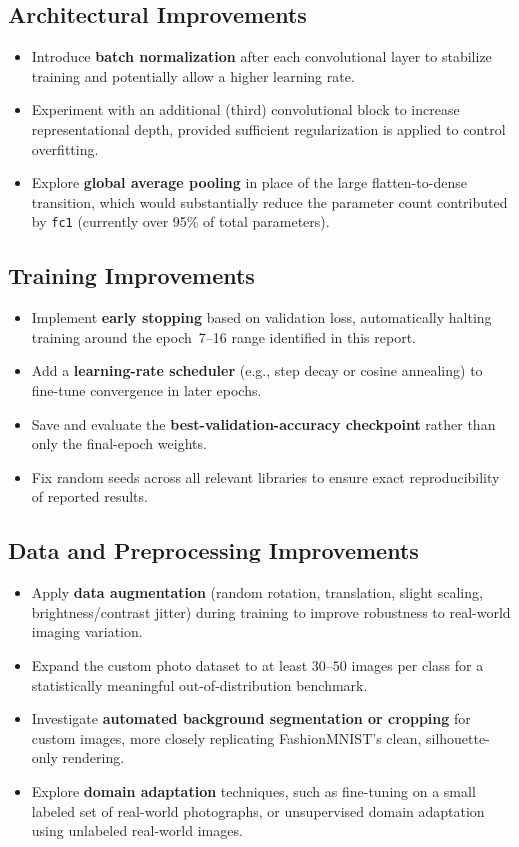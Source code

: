 \documentclass[12pt,a4paper]{report}
\begin{document}
\subsection{Architectural Improvements}
\begin{itemize}
    \item Introduce \textbf{batch normalization} after each convolutional layer to stabilize training and potentially allow a higher learning rate.
    \item Experiment with an additional (third) convolutional block to increase representational depth, provided sufficient regularization is applied to control overfitting.
    \item Explore \textbf{global average pooling} in place of the large flatten-to-dense transition, which would substantially reduce the parameter count contributed by \texttt{fc1} (currently over 95\% of total parameters).
\end{itemize}

\subsection{Training Improvements}
\begin{itemize}
    \item Implement \textbf{early stopping} based on validation loss, automatically halting training around the epoch~7--16 range identified in this report.
    \item Add a \textbf{learning-rate scheduler} (e.g., step decay or cosine annealing) to fine-tune convergence in later epochs.
    \item Save and evaluate the \textbf{best-validation-accuracy checkpoint} rather than only the final-epoch weights.
    \item Fix random seeds across all relevant libraries to ensure exact reproducibility of reported results.
\end{itemize}

\subsection{Data and Preprocessing Improvements}
\begin{itemize}
    \item Apply \textbf{data augmentation} (random rotation, translation, slight scaling, brightness/contrast jitter) during training to improve robustness to real-world imaging variation.
    \item Expand the custom photo dataset to at least $30$--$50$ images per class for a statistically meaningful out-of-distribution benchmark.
    \item Investigate \textbf{automated background segmentation or cropping} for custom images, more closely replicating FashionMNIST's clean, silhouette-only rendering.
    \item Explore \textbf{domain adaptation} techniques, such as fine-tuning on a small labeled set of real-world photographs, or unsupervised domain adaptation using unlabeled real-world images.
\end{itemize}
\end{document}
